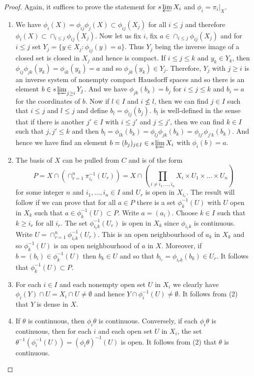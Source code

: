 \documentclass[12pt]{report}
\theoremstyle{definition}
\begin{document}
\begin{proof}
	Again, it suffices to prove the statement for $s\varprojlim X_i$ and $\phi_i=\pi_i|_X$. \begin{enumerate}
		\item We have $\phi_i(X)=\phi_{ij}\phi_j(X)\subset \phi_{ij}(X_j)$ for all $i\leq j$ and therefore $\phi_i(X)\subset \cap_{i\leq j}\phi_{ij}(X_j)$.  Now let us fix $i$, fix $a\in \cap_{i\leq j}\phi_{ij}(X_j)$ and for $i\leq j$ set $Y_j=\{y\in X_j: \phi_{ij}(y)=a\}$. Thus $Y_j$ being the inverse image of a closed set is closed in $X_j$ and hence is compact. If $i\leq j\leq k$ and $y_k\in Y_k$, then $\phi_{ij}\phi_{jk}(y_k)=\phi_{ik}(y_k)=a$ and so $\phi_{jk}(y_k)\in Y_j$. Therefore, $Y_j$ with $ j\geq i$ is an inverse system of nonempty compact Hausdorff spaces and so there is an element $b\in s\varprojlim_{j\geq i} Y_j$. And we have $\phi_{jk}(b_k)=b_j$ for $i\leq j\leq k$ and $b_i=a$ for the coordinates of $b$. Now if $l\in I$ and $i\nleq l$, then we can find $j\in I$ such that $i\leq j$ and $l\leq j$ and define $b_l=\phi_{lj}(b_j)$. $b_l$ is well-defined in the sense that if there is another $j'\in I$ with $i\leq j'$ and $j\leq j'$, then we can find $k\in I$ such that $j,j'\leq k$ and then $b_l=\phi_{lk}(b_k)=\phi_{lj}\phi_{jk}(b_k)=\phi_{lj'}\phi_{j'k}(b_k)$. And hence we have find an element $b=(b_j)_{j\in I}\in s\varprojlim X_i$ with $\phi_i(b)=a$.
		\item The basis of $X$ can be pulled from $C$ and is of the form $$P=X\cap (\cap_{r=1}^n\pi_{i_r}^{-1}(U_r))=X\cap(\prod_{i\not= i_1,\dots,i_n} X_i\times U_1\times \dots\times U_n ) $$ for some integer $n$ and $i_1,\dots,i_n \in I$ and $U_r$ is open in $X_{i_r}$. The result will follow if we can prove that for all $a\in P$ there is a set $\phi_k^{-1}(U)$ with $U$ open in $X_k$ such that $a\in \phi_k^{-1}(U)\subset P$. Write $a=(a_i)$. Choose $k\in I$ such that $k\geq i_r$ for all $i_r$. The set $\phi_{i_rk}^{-1}(U_r)$ is open in $X_k$ since $\phi_{i_rk}$ is continuous. Write $U=\cap_{r=1}^n \phi_{i_rk}^{-1}(U_r)$. This is an open neighbourhood of $a_k$ in $X_k$ and so $\phi_k^{-1}(U)$ is an open neighbourhood of $a$ in $X$. Moreover, if $b=(b_i)\in \phi_k^{-1}(U)$ then $b_k\in U$ and so that $b_{i_r}=\phi_{i_r k}(b_k)\in U_r$. It follows that $\phi^{-1}_k(U)\subset P$.
		\item For each $i\in I$ and each nonempty open set $U$ in $X_i$ we clearly have $\phi_i(Y)\cap U=X_i\cap U\not= \emptyset$ and hence $Y\cap \phi_i^{-1}(U)\not=\emptyset$. It follows from (2) that $Y$ is dense in $X$.
		\item If $\theta$ is continuous, then $\phi_i\theta$ is continuous. Conversely, if each $\phi_i\theta$ is continuous, then for each $i$ and each open set $U$ in $X_i$, the set $\theta^{-1}(\phi_i^{-1}(U))=(\phi_i\theta)^{-1}(U)$ is open. It follows from (2) that $\theta$ is continuous.

\end{enumerate}
\end{proof}
\end{document}
